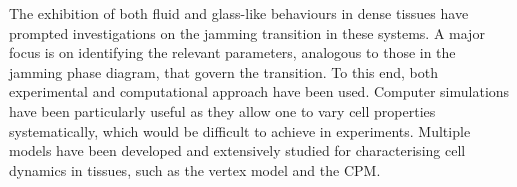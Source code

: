 \documentclass[a4paper,12pt]{article}
\begin{document}
The exhibition of both fluid and glass-like behaviours in dense tissues have prompted investigations on the jamming transition in these systems. A major focus is on identifying the relevant parameters, analogous to those in the jamming phase diagram, that govern the transition. To this end, both experimental and computational approach have been used. Computer simulations have been particularly useful as they allow one to vary cell properties systematically, which would be difficult to achieve in experiments. Multiple models have been developed and extensively studied for characterising cell dynamics in tissues, such as the vertex model and the CPM.  

%
%
\end{document}
